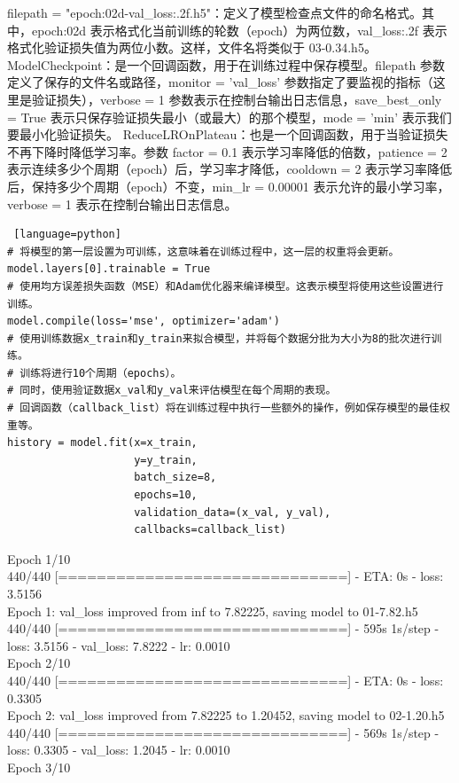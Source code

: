 \documentclass{article}
\begin{document}
filepath = "{epoch:02d}-{val\_loss:.2f}.h5"：定义了模型检查点文件的命名格式。其中，{epoch:02d} 表示格式化当前训练的轮数（epoch）为两位数，{val\_loss:.2f} 表示格式化验证损失值为两位小数。这样，文件名将类似于 03-0.34.h5。 ModelCheckpoint：是一个回调函数，用于在训练过程中保存模型。filepath 参数定义了保存的文件名或路径，monitor = 'val\_loss' 参数指定了要监视的指标（这里是验证损失），verbose = 1 参数表示在控制台输出日志信息，save\_best\_only = True 表示只保存验证损失最小（或最大）的那个模型，mode = 'min' 表示我们要最小化验证损失。 ReduceLROnPlateau：也是一个回调函数，用于当验证损失不再下降时降低学习率。参数 factor = 0.1 表示学习率降低的倍数，patience = 2 表示连续多少个周期（epoch）后，学习率才降低，cooldown = 2 表示学习率降低后，保持多少个周期（epoch）不变，min\_lr = 0.00001 表示允许的最小学习率，verbose = 1 表示在控制台输出日志信息。
\begin{lstlisting} [language=python]
# 将模型的第一层设置为可训练，这意味着在训练过程中，这一层的权重将会更新。  
model.layers[0].trainable = True  
# 使用均方误差损失函数（MSE）和Adam优化器来编译模型。这表示模型将使用这些设置进行训练。  
model.compile(loss='mse', optimizer='adam')  
# 使用训练数据x_train和y_train来拟合模型，并将每个数据分批为大小为8的批次进行训练。  
# 训练将进行10个周期（epochs）。  
# 同时，使用验证数据x_val和y_val来评估模型在每个周期的表现。  
# 回调函数（callback_list）将在训练过程中执行一些额外的操作，例如保存模型的最佳权重等。  
history = model.fit(x=x_train,   
                    y=y_train,   
                    batch_size=8,  
                    epochs=10,  
                    validation_data=(x_val, y_val),  
                    callbacks=callback_list)
\end{lstlisting}
Epoch 1/10\\
440/440 [==============================] - ETA: 0s - loss: 3.5156\\
Epoch 1: val\_loss improved from inf to 7.82225, saving model to 01-7.82.h5\\
440/440 [==============================] - 595s 1s/step - loss: 3.5156 - val\_loss: 7.8222 - lr: 0.0010\\
Epoch 2/10\\
440/440 [==============================] - ETA: 0s - loss: 0.3305\\
Epoch 2: val\_loss improved from 7.82225 to 1.20452, saving model to 02-1.20.h5\\
440/440 [==============================] - 569s 1s/step - loss: 0.3305 - val\_loss: 1.2045 - lr: 0.0010\\
Epoch 3/10\\
\end{document}
